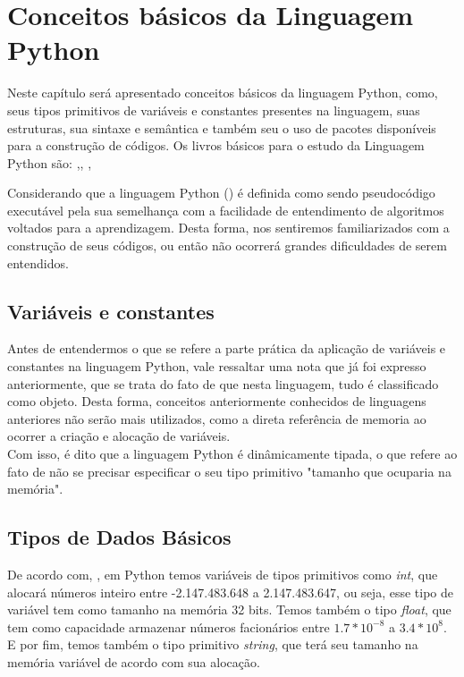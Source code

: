 

\chapter{ Conceitos b\'{a}sicos da Linguagem Python}

Neste capítulo será apresentado conceitos básicos da linguagem Python, como, seus tipos primitivos de variáveis e constantes presentes na linguagem, suas estruturas, sua sintaxe e semântica e também seu o uso de pacotes disponíveis para a construção de códigos. Os livros b\'{a}sicos para o estudo da Linguagem Python s\~{a}o:\cite{Manzano2018} ,\cite{Summerfield2013}, \cite{Guttag2015}, \cite{Perkovic2016}


Considerando que a linguagem Python (\cite{Manzano2018}) \'{e} definida como sendo pseudocódigo executável pela sua semelhança com a facilidade de entendimento de algoritmos voltados para a aprendizagem. Desta forma, nos sentiremos familiarizados com a construção de seus códigos, ou então não ocorrerá grandes dificuldades de serem entendidos.
    \section{Vari\'{a}veis e constantes}
Antes de entendermos o que se refere a parte prática da aplicação de variáveis e constantes na linguagem Python, vale ressaltar uma nota que já foi expresso anteriormente, que se trata do fato de que nesta linguagem, tudo é classificado como objeto. Desta forma, conceitos anteriormente conhecidos de linguagens anteriores não serão mais utilizados, como a direta referência de memoria ao ocorrer a criação e alocação de variáveis.\\
Com isso, é dito que a linguagem Python é dinâmicamente tipada, o que refere ao fato de não se precisar especificar o seu tipo primitivo "tamanho que ocuparia na memória".  


    \section{Tipos de Dados B\'{a}sicos}
 De acordo com, \cite{Menezes2016}, em Python temos variáveis de tipos primitivos como \textit{int}, que alocará números inteiro entre -2.147.483.648 a 2.147.483.647, ou seja, esse tipo de variável tem como tamanho na memória 32 bits. Temos também o tipo \textit{float}, que tem como capacidade armazenar números facionários entre $1.7*10^{-8}$ a $3.4*10^{8}$. E por fim, temos também o tipo primitivo \textit{string}, que terá seu tamanho na memória variável de acordo com sua alocação. 

